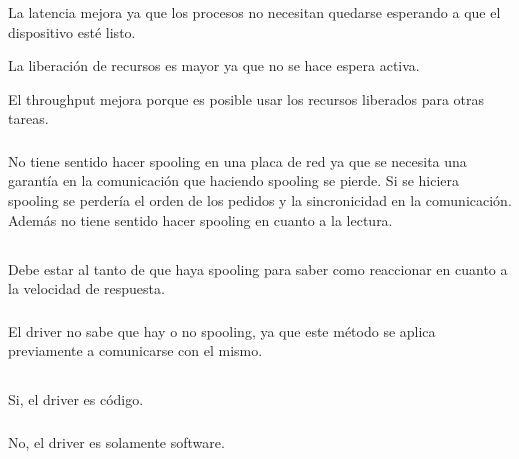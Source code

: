 \subsubsection{}
La latencia mejora ya que los procesos no necesitan quedarse esperando a que
el dispositivo esté listo.

La liberación de recursos es mayor ya que no se hace espera activa.

El throughput mejora porque es posible usar los recursos liberados para otras
tareas.

\subsubsection{}
No tiene sentido hacer spooling en una placa de red ya que se necesita una
garantía en la comunicación que haciendo spooling se pierde. Si se hiciera
spooling se perdería el orden de los pedidos y la sincronicidad en la
comunicación. Además no tiene sentido hacer spooling en cuanto a la lectura.

\subsection{}

\subsubsection{}
Debe estar al tanto de que haya spooling para saber como reaccionar en cuanto
a la velocidad de respuesta.

\subsubsection{}
El driver no sabe que hay o no spooling, ya que este método se aplica
previamente a comunicarse con el mismo.

\subsection{}

\subsubsection{}
Si, el driver es código.

\subsubsection{}
No, el driver es solamente software.

